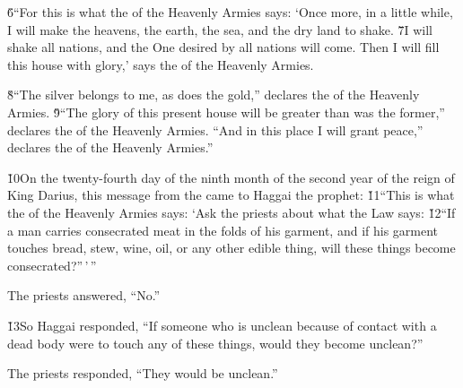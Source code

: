 \v{6}``For this is what the  of the Heavenly Armies says: `Once more, in a little while, I will make the heavens, the earth, the sea, and the dry land to shake. \v{7}I will shake all nations, and the One desired by all nations will come. Then I will fill this house with glory,' says the  of the Heavenly Armies.

\v{8}``The silver belongs to me, as does the gold,'' declares the  of the Heavenly Armies. \v{9}``The glory of this present house will be greater than was the former,'' declares the  of the Heavenly Armies. ``And in this place I will grant peace,'' declares the  of the Heavenly Armies.''

\v{10}On the twenty-fourth day of the ninth month of the second year of the reign of King Darius, this message from the  came to Haggai the prophet: \v{11}``This is what the  of the Heavenly Armies says: `Ask the priests about what the Law says: \v{12}``If a man carries consecrated meat in the folds of his garment, and if his garment touches bread, stew, wine, oil, or any other edible thing, will these things become consecrated?''\,'\,''

The priests answered, ``No.''

\v{13}So Haggai responded, ``If someone who is unclean because of contact with a dead body were to touch any of these things, would they become unclean?''

The priests responded, ``They would be unclean.''

